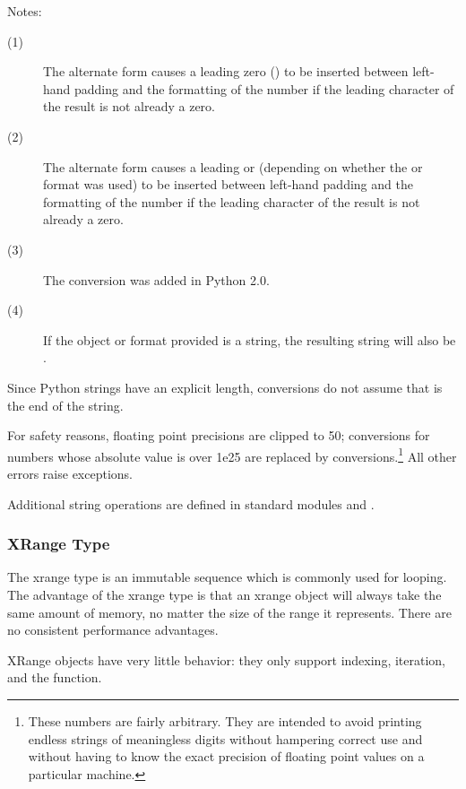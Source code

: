 \noindent
Notes:
\begin{description}
  \item[(1)]
    The alternate form causes a leading zero () to be
    inserted between left-hand padding and the formatting of the
    number if the leading character of the result is not already a
    zero.
  \item[(2)]
    The alternate form causes a leading  or 
    (depending on whether the  or  format
    was used) to be inserted between left-hand padding and the
    formatting of the number if the leading character of the result is
    not already a zero.
  \item[(3)]
    The  conversion was added in Python 2.0.
  \item[(4)]
    If the object or format provided is a  string,
    the resulting string will also be .
\end{description}


Since Python strings have an explicit length,  conversions
do not assume that  is the end of the string.

For safety reasons, floating point precisions are clipped to 50;
 conversions for numbers whose absolute value is over 1e25
are replaced by  conversions.\footnote{
  These numbers are fairly arbitrary.  They are intended to
  avoid printing endless strings of meaningless digits without hampering
  correct use and without having to know the exact precision of floating
  point values on a particular machine.
}  All other errors raise exceptions.

Additional string operations are defined in standard modules
 and
.


\subsubsection{XRange Type \label{typesseq-xrange}}

The xrange type is an immutable sequence which is
commonly used for looping.  The advantage of the xrange type is that an
xrange object will always take the same amount of memory, no matter the
size of the range it represents.  There are no consistent performance
advantages.

XRange objects have very little behavior: they only support indexing,
iteration, and the  function.


